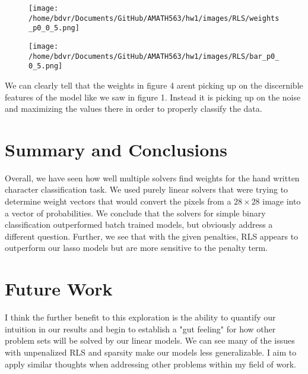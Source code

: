 \documentclass[12pt]{article}
\begin{document}
		\begin{figure}[H]
		\centering
		\begin{minipage}{.5\textwidth}
			\centering
			\texttt{[image: /home/bdvr/Documents/GitHub/AMATH563/hw1/images/RLS/weights\_p0\_0\_5.png]}
			\label{fig:test1}
		\end{minipage}%
		\begin{minipage}{.5\textwidth}
			\centering
			\texttt{[image: /home/bdvr/Documents/GitHub/AMATH563/hw1/images/RLS/bar\_p0\_0\_5.png]}
			\label{fig:test2}
		\end{minipage}
	\end{figure}
	We can clearly tell that the weights in figure 4 arent picking up on the discernible features of the model like we saw in figure 1. Instead it is picking up on the noise and maximizing the values there in order to properly classify the data.

	\section[see]{Summary and Conclusions}
	Overall, we have seen how well multiple solvers find weights for the hand written character classification task. We used purely linear solvers that were trying to determine weight vectors that would convert the pixels from a $28\times 28$ image into a vector of probabilities. We conclude that the solvers for simple binary classification outperformed batch trained models, but obviously address a different question. Further, we see that with the given penalties, RLS appears to outperform our lasso models but are more sensitive to the penalty term.
	\section{Future Work}
	I think the further benefit to this exploration is the ability to quantify our intuition in our results and begin to establish a "gut feeling" for how other problem sets will be solved by our linear models. We can see many of the issues with unpenalized RLS and sparsity make our models less generalizable. I aim to apply similar thoughts when addressing other problems within my field of work.
\end{document}
